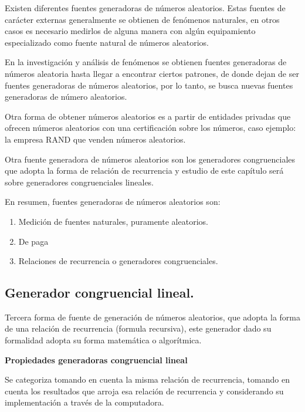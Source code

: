 \documentclass[11pt,letterpaper]{report}
\begin{document}
Existen diferentes fuentes generadoras de números aleatorios. Estas fuentes de carácter externas generalmente se obtienen de fenómenos naturales, en otros casos es necesario medirlos de alguna manera con algún equipamiento especializado como fuente natural de números aleatorios.

En la investigación y análisis de fenómenos se obtienen fuentes generadoras de números aleatoria hasta llegar a encontrar ciertos patrones, de donde dejan de ser fuentes generadoras de números aleatorios, por lo tanto, se busca nuevas fuentes generadoras de número aleatorios.

Otra forma de obtener números aleatorios es a partir de entidades privadas que ofrecen números aleatorios con una certificación sobre los números, caso ejemplo: la empresa RAND que venden números aleatorios.

Otra fuente generadora de números aleatorios son los generadores congruenciales que adopta la forma de relación de recurrencia y estudio de este capítulo será sobre generadores congruenciales lineales.

En resumen, fuentes generadoras de números aleatorios son:
\begin{enumerate}
\item Medición de fuentes naturales, puramente aleatorios.
\item De paga
\item Relaciones de recurrencia o generadores congruenciales.
\end{enumerate}

\subsection*{Generador congruencial lineal.}

Tercera forma de fuente de generación de números aleatorios, que adopta la forma de una relación de recurrencia (formula recursiva), este generador dado su formalidad adopta su forma matemática o algorítmica.

\textbf{Propiedades generadoras congruencial lineal}

Se categoriza tomando en cuenta la misma relación de recurrencia, tomando en cuenta los resultados que arroja esa relación de recurrencia y considerando su implementación a través de la computadora.
\end{document}
